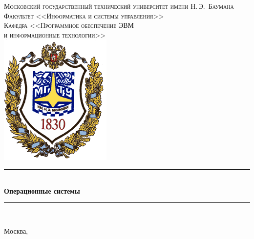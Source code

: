 \newcommand{\HRule}{\rule{\linewidth}{0.5mm}}

\begin{center}

\textsc{\large Московский государственный технический университет имени Н.\,Э.~Баумана}\\[0.5cm]
\textsc{Факультет <<Информатика и системы управления>>}\\
\textsc{Кафедра <<Программное обеспечение ЭВМ\\и информационные технологии>>}\\[0.25cm]

\includegraphics[scale=0.5]{assets/bmstu-logo.png}~\\[2.25cm]

\HRule \\[0.5cm]
{\huge \bfseries Операционные системы}

\HRule \\[0.5cm]

\vfill


{\large Москва, \the\year}

\end{center}

\newpage
{}